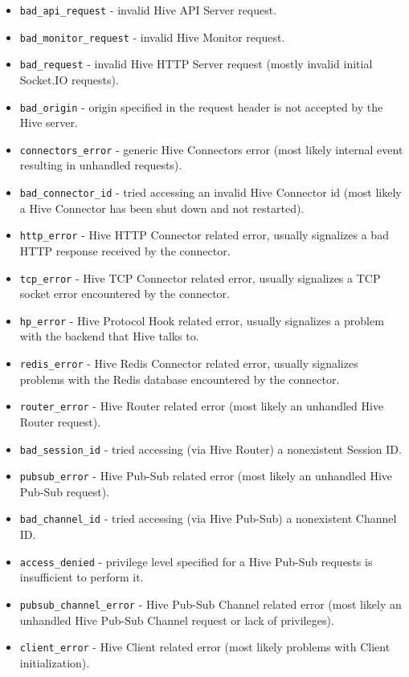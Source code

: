 \documentclass[a4paper]{article}
\begin{document}
\begin{itemize}
\item \texttt{bad\_api\_request} - invalid Hive API Server request.
\item \texttt{bad\_monitor\_request} - invalid Hive Monitor request.
\item \texttt{bad\_request} - invalid Hive HTTP Server request (mostly invalid initial Socket.IO requests).
\item \texttt{bad\_origin} - origin specified in the request header is not accepted by the Hive server.
\item \texttt{connectors\_error} - generic Hive Connectors error (most likely internal event resulting in unhandled requests).
\item \texttt{bad\_connector\_id} - tried accessing an invalid Hive Connector id (most likely a Hive Connector has been shut down and not restarted).
\item \texttt{http\_error} - Hive HTTP Connector related error, usually signalizes a bad HTTP response received by the connector.
\item \texttt{tcp\_error} - Hive TCP Connector related error, usually signalizes a TCP socket error encountered by the connector.
\item \texttt{hp\_error} - Hive Protocol Hook related error, usually signalizes a problem with the backend that Hive talks to.
\item \texttt{redis\_error} - Hive Redis Connector related error, usually signalizes problems with the Redis database encountered by the connector.
\item \texttt{router\_error} - Hive Router related error (most likely an unhandled Hive Router request).
\item \texttt{bad\_session\_id} - tried accessing (via Hive Router) a nonexistent Session ID.
\item \texttt{pubsub\_error} - Hive Pub-Sub related error (most likely an unhandled Hive Pub-Sub request).
\item \texttt{bad\_channel\_id} - tried accessing (via Hive Pub-Sub) a nonexistent Channel ID.
\item \texttt{access\_denied} - privilege level specified for a Hive Pub-Sub requests is insufficient to perform it.
\item \texttt{pubsub\_channel\_error} - Hive Pub-Sub Channel related error (most likely an unhandled Hive Pub-Sub Channel request or lack of privileges).
\item \texttt{client\_error} - Hive Client related error (most likely problems with Client initialization).

\end{itemize}
\end{document}
